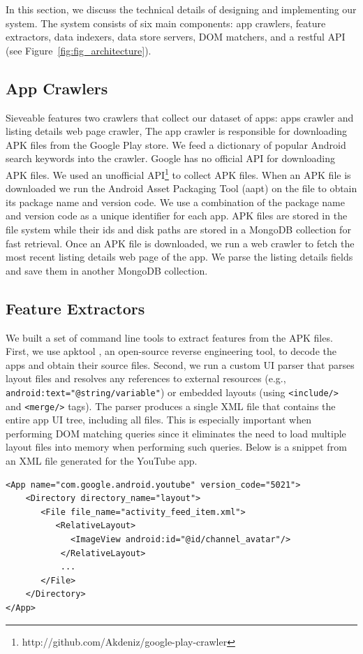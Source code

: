 In this section, we discuss the technical details of designing and implementing our system. The system consists of six main components: app crawlers, feature extractors, data indexers, data store servers, DOM matchers, and a restful API (see Figure~\ref{fig:fig_architecture}).

\subsection{App Crawlers}
Sieveable features two crawlers that collect our dataset of apps: apps crawler and listing details web page crawler,
The app crawler is responsible for downloading APK files from the Google Play store.
We feed a dictionary of popular Android search keywords into the crawler.
Google has no official API for downloading APK files.
We used an unofficial API\footnote{http://github.com/Akdeniz/google-play-crawler} to collect APK files.
When an APK file is downloaded we run the Android Asset Packaging Tool (aapt) on the file to obtain its package name and version code.
We use a combination of the package name and version code as a unique identifier for each app.
APK files are stored in the file system while their ids and disk paths are stored in a MongoDB collection for fast retrieval.
Once an APK file is downloaded, we run a web crawler to fetch the most recent listing details web page of the app.
We parse the listing details fields and save them in another MongoDB collection.

\subsection{Feature Extractors}
We built a set of command line tools to extract features from the APK files.
First, we use apktool \cite{apktool}, an open-source reverse engineering tool, to decode the apps and obtain their source files.
Second, we run a custom UI parser that parses layout files and resolves any references to external resources (e.g., \texttt{android:text="@string/variable"}) or embedded layouts (using \texttt{<include/>} and \texttt{<merge/>} tags).
The parser produces a single XML file that contains the entire app UI tree, including all files.
This is especially important when performing DOM matching queries since it eliminates the need to load multiple layout files into memory when performing such queries.
Below is a snippet from an XML file generated for the YouTube app.

\begin{verbatim}
<App name="com.google.android.youtube" version_code="5021">
    <Directory directory_name="layout">
       <File file_name="activity_feed_item.xml">
          <RelativeLayout>
             <ImageView android:id="@id/channel_avatar"/>
           </RelativeLayout>
           ...
       </File>
    </Directory>
</App>
\end{verbatim}

